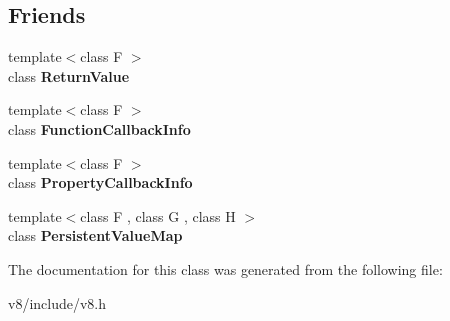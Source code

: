 \subsection*{Friends}
\begin{DoxyCompactItemize}
\item 
\hypertarget{classv8_1_1ReturnValue_a53f604d3d6f2dc0647df33c9979f116a}{}{\footnotesize template$<$class F $>$ }\\class {\bfseries Return\+Value}\label{classv8_1_1ReturnValue_a53f604d3d6f2dc0647df33c9979f116a}

\item 
\hypertarget{classv8_1_1ReturnValue_a76786e6fa2d0eac5e2d4f647659d0d23}{}{\footnotesize template$<$class F $>$ }\\class {\bfseries Function\+Callback\+Info}\label{classv8_1_1ReturnValue_a76786e6fa2d0eac5e2d4f647659d0d23}

\item 
\hypertarget{classv8_1_1ReturnValue_a5018adab21fade2b42f4f60e45fa1083}{}{\footnotesize template$<$class F $>$ }\\class {\bfseries Property\+Callback\+Info}\label{classv8_1_1ReturnValue_a5018adab21fade2b42f4f60e45fa1083}

\item 
\hypertarget{classv8_1_1ReturnValue_a401e5cd2db49a67497042617f01fdbc2}{}{\footnotesize template$<$class F , class G , class H $>$ }\\class {\bfseries Persistent\+Value\+Map}\label{classv8_1_1ReturnValue_a401e5cd2db49a67497042617f01fdbc2}

\end{DoxyCompactItemize}


The documentation for this class was generated from the following file\+:\begin{DoxyCompactItemize}
\item 
v8/include/v8.\+h\end{DoxyCompactItemize}
